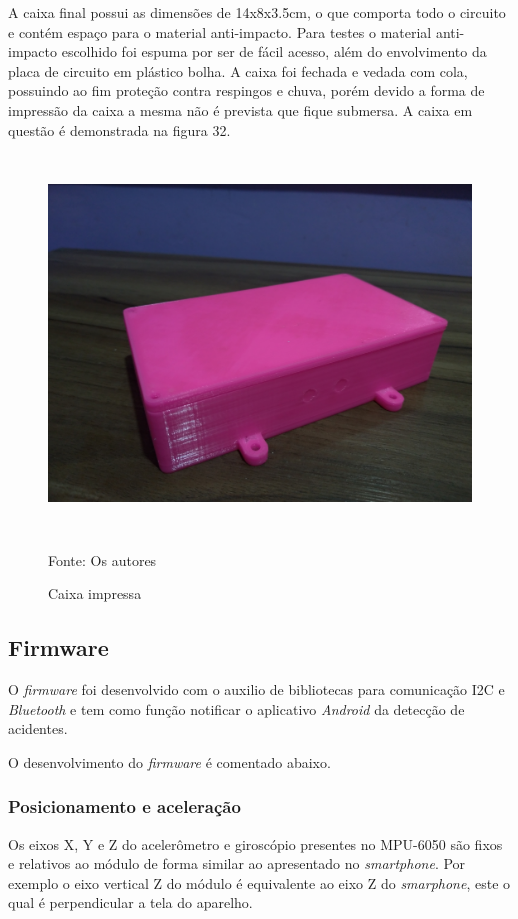 A caixa final possui as dimensões de 14x8x3.5cm, o que comporta todo o circuito e contém espaço para o material anti-impacto. Para testes o material anti-impacto escolhido foi espuma por ser de fácil acesso, além do envolvimento da placa de circuito em plástico bolha. A caixa foi fechada e vedada com cola, possuindo ao fim proteção contra respingos e chuva, porém devido a forma de impressão da caixa a mesma não é prevista que fique submersa. A caixa em questão é demonstrada na figura 32.

 \begin{figure}[H]

\begin{center}
     \caption{Caixa impressa}
  \includegraphics[width=150mm,height=100mm]{images/Cap4/caixa_tampa.jpg}
\end{center}
 \scriptsize Fonte: Os autores
  
\end{figure}

\subsection{\textbf{Firmware}}

O \textit{firmware} foi desenvolvido com o auxilio de bibliotecas para comunicação I2C e \textit{Bluetooth} e tem como função notificar o aplicativo \textit{Android} da detecção de acidentes.

O desenvolvimento do \textit{firmware} é comentado abaixo.


\subsubsection{Posicionamento e aceleração}
Os eixos X, Y e Z do acelerômetro e giroscópio presentes no MPU-6050 são fixos e relativos ao módulo de forma similar ao apresentado no \textit{smartphone}. Por exemplo o eixo vertical Z do módulo é equivalente ao eixo Z do \textit{smarphone}, este o qual é perpendicular a tela do aparelho.

